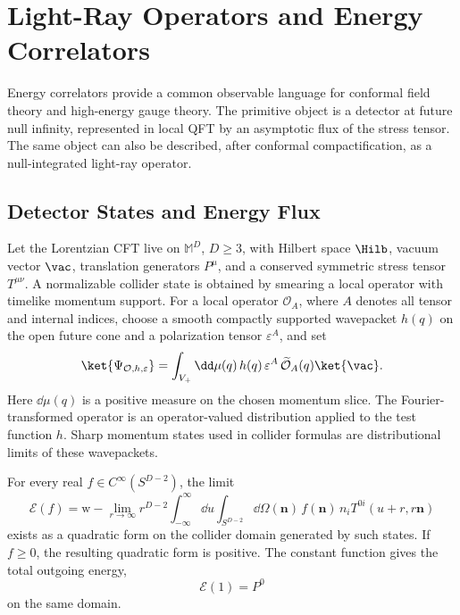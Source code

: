 \chapter{Light-Ray Operators and Energy Correlators}
\label{ch:cft-light-ray-energy-correlators}

\ConventionsMixedCFT

Energy correlators provide a common observable language for conformal field
theory and high-energy gauge theory.  The primitive object is a detector at
future null infinity, represented in local QFT by an asymptotic flux of the
stress tensor.  The same object can also be described, after conformal
compactification, as a null-integrated light-ray operator.

\section{Detector States and Energy Flux}

Let the Lorentzian CFT live on \(\mathbb M^D\), \(D\geq3\), with Hilbert space
\(\Hilb\), vacuum vector \(\vac\), translation generators \(P^\mu\), and a
conserved symmetric stress tensor \(T^{\mu\nu}\).  A normalizable collider
state is obtained by smearing a local operator with timelike momentum support.
For a local operator \(\mathcal O_A\), where \(A\) denotes all tensor and
internal indices, choose a smooth compactly supported wavepacket
\(h(q)\) on the open future cone and a polarization tensor \(\varepsilon^A\),
and set
\[
  \ket{\Psi_{\mathcal O,h,\varepsilon}}
  =
  \int_{V_+}\dd\mu(q)\,
  h(q)\,\varepsilon^A\,\widetilde{\mathcal O}_A(q)\ket{\vac}.
\]
Here \(\dd\mu(q)\) is a positive measure on the chosen momentum slice.  The
Fourier-transformed operator is an operator-valued distribution applied to the
test function \(h\).  Sharp momentum states used in collider formulas are
distributional limits of these wavepackets.

\begin{hypothesis}
\label{hyp:cft-energy-detector}
For every real \(f\in C^\infty(S^{D-2})\), the limit
\begin{equation}
  \mathcal E(f)
  =
  \mathrm{w}\!-\!\lim_{r\to\infty}
  r^{D-2}
  \int_{-\infty}^{\infty}\dd u
  \int_{S^{D-2}}\dd\Omega(\mathbf n)\,
  f(\mathbf n)\,
  n_i T^{0i}(u+r,r\mathbf n)
  \label{eq:cft-energy-detector}
\end{equation}
exists as a quadratic form on the collider domain generated by such states.
If \(f\geq0\), the resulting quadratic form is positive.  The constant
function gives the total outgoing energy,
\[
  \mathcal E(1)=P^0
\]
on the same domain.
\end{hypothesis}

